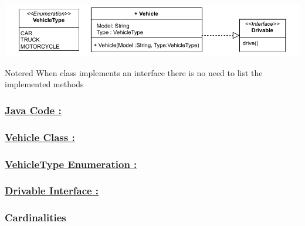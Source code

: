 \includegraphics[width=\textwidth]{Chapters/Diagram/OOP/EX1/ex1.drawio.pdf}

\begin{prettyBox}{Note}{red}
When class implements an interface there is no need to list the implemented methods
\end{prettyBox}


\subsubsection*{\underline{Java Code :}}

\subsubsection*{\underline{Vehicle Class :}}


\newpage
\subsubsection*{\underline{VehicleType Enumeration :}}

\subsubsection*{\underline{Drivable Interface :}}



\subsubsection{Cardinalities}


